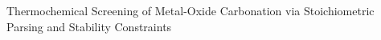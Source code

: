 \documentclass[]{article}
\begin{document}
Thermochemical Screening of Metal-Oxide Carbonation via Stoichiometric Parsing and Stability Constraints
\end{document}
